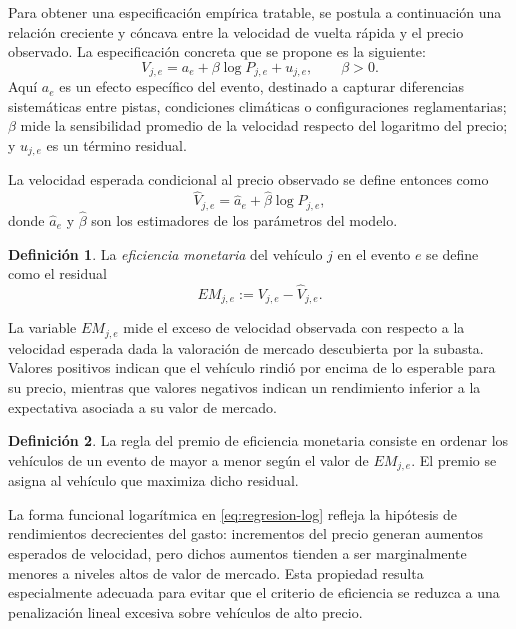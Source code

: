 \documentclass[11pt,a4paper]{article}
\theoremstyle{definition}
\newtheorem{definicion}{Definición}
\begin{document}
Para obtener una especificación empírica tratable, se postula a continuación una relación creciente y cóncava entre la velocidad de vuelta rápida y el precio observado. La especificación concreta que se propone es la siguiente:
\begin{equation}\label{eq:regresion-log}
V_{j,e}=a_e+\beta \log P_{j,e}+u_{j,e},
\qquad \beta>0.
\end{equation}
Aquí $a_e$ es un efecto específico del evento, destinado a capturar diferencias sistemáticas entre pistas, condiciones climáticas o configuraciones reglamentarias; $\beta$ mide la sensibilidad promedio de la velocidad respecto del logaritmo del precio; y $u_{j,e}$ es un término residual.

La velocidad esperada condicional al precio observado se define entonces como
\begin{equation}\label{eq:vel-esp}
\widehat{V}_{j,e}=\widehat{a}_e+\widehat{\beta}\log P_{j,e},
\end{equation}
donde $\widehat{a}_e$ y $\widehat{\beta}$ son los estimadores de los parámetros del modelo.

\begin{definicion}
La \emph{eficiencia monetaria} del vehículo $j$ en el evento $e$ se define como el residual
\begin{equation}\label{eq:eficiencia}
EM_{j,e}:=V_{j,e}-\widehat{V}_{j,e}.
\end{equation}
\end{definicion}

La variable $EM_{j,e}$ mide el exceso de velocidad observada con respecto a la velocidad esperada dada la valoración de mercado descubierta por la subasta. Valores positivos indican que el vehículo rindió por encima de lo esperable para su precio, mientras que valores negativos indican un rendimiento inferior a la expectativa asociada a su valor de mercado.

\begin{definicion}
La regla del premio de eficiencia monetaria consiste en ordenar los vehículos de un evento de mayor a menor según el valor de $EM_{j,e}$. El premio se asigna al vehículo que maximiza dicho residual.
\end{definicion}

La forma funcional logarítmica en \eqref{eq:regresion-log} refleja la hipótesis de rendimientos decrecientes del gasto: incrementos del precio generan aumentos esperados de velocidad, pero dichos aumentos tienden a ser marginalmente menores a niveles altos de valor de mercado. Esta propiedad resulta especialmente adecuada para evitar que el criterio de eficiencia se reduzca a una penalización lineal excesiva sobre vehículos de alto precio.
\end{document}
